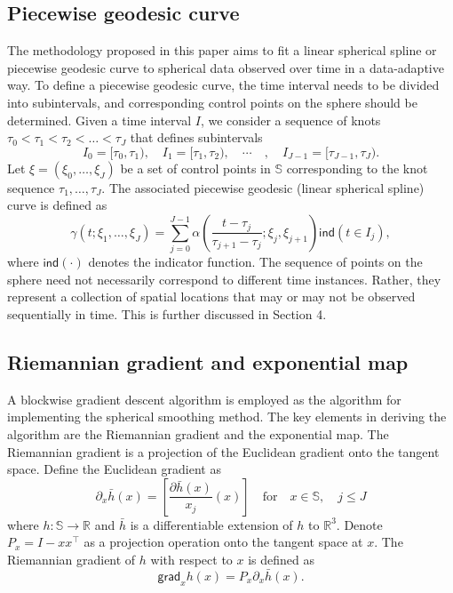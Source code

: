 \subsection*{Piecewise geodesic curve}\label{piecewise-geodesic-curve}

The methodology proposed in this paper aims to fit a linear spherical spline or piecewise geodesic curve to spherical data observed over time in a data-adaptive way. To define a piecewise geodesic curve, the time interval needs to be divided into subintervals, and corresponding control points on the sphere should be determined. Given a time interval \(I\), we consider a sequence of knots \(\tau_0 < \tau_1 < \tau_2 < \dots < \tau_J\) that defines subintervals
\[
I_0 = [\tau_0, \tau_1), \quad
I_1 = [\tau_1, \tau_2),\quad  \cdots \quad , \quad I_{J-1} = [\tau_{J-1}, \tau_J).
\]
Let \(\xi = (\xi_0,\ldots, \xi_J)\) be a set of control points in \(\mathbb{S}\) corresponding to the knot sequence \(\tau_1, \ldots, \tau_J\). The associated piecewise geodesic (linear spherical spline) curve is defined as
\[
\gamma(t;\xi_1, \ldots, \xi_J) = \sum_{j=0}^{J-1}\alpha\left(\dfrac{t-\tau_j}{\tau_{j+1}-\tau_j}; \xi_j, \xi_{j+1}\right) \mathsf{ind}(t\in I_j),
\]
where \(\mathsf{ind}(\cdot)\) denotes the indicator function.
The sequence of points on the sphere need not necessarily correspond to different time instances.
Rather, they represent a collection of spatial locations that may or may not be observed sequentially in time.
This is further discussed in Section 4.

\subsection*{Riemannian gradient and exponential map}\label{riemannian-gradient-and-exponential-map}

A blockwise gradient descent algorithm is employed as the algorithm for implementing the spherical smoothing method. The key elements in deriving the algorithm are the Riemannian gradient and the exponential map. The Riemannian gradient is a projection of the Euclidean gradient onto the tangent space. Define the Euclidean gradient as
\[
\partial_x \bar{h}(x) = \left[ \frac{\partial\bar{h}(x)}{x_j}(x) \right] \quad \text{for} \quad x \in \mathbb{S}, \quad j \leq J
\]
where \(h:\mathbb{S} \to \mathbb{R}\) and \(\bar{h}\) is a differentiable extension of \(h\) to \(\mathbb{R}^3\). Denote \(P_x = I - xx^\top\) as a projection operation onto the tangent space at \(x\). The Riemannian gradient of \(h\) with respect to \(x\) is defined as
\[
\mathsf{grad}_x h(x) = P_x \partial_x \bar{h}(x).
\]


